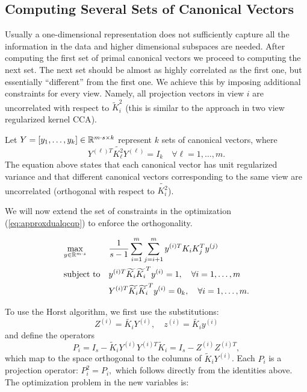 \subsection{Computing Several Sets of Canonical Vectors}\label{chap:extensions:severalCanonicalVectors}
Usually a one-dimensional representation does not sufficiently capture
all the information in the data and higher dimensional subspaces are
needed. After computing the first set of primal canonical vectors we
proceed to computing the next set. The next set should be almost as
highly correlated as the first one, but essentially ``different'' from
the first one. We achieve this by imposing additional constraints for
every view. Namely, all projection vectors in view $i$ are
uncorrelated with respect to $\widetilde{K}_i^2$ (this is similar to
the approach in two view regularized kernel CCA\cite{FBMJ}).
\par
Let $Y = \left[y_1, \ldots, y_k\right] \in \mathbb{R}^{m\cdot s  \times k}$
represent $k$ sets of canonical vectors, where
$$Y^{(\ell)T} \widetilde{K_{\ell}^2} Y^{(\ell)} = I_k  \quad\forall \ell = 1,\ldots, m. $$
The equation above states that each canonical vector has unit regularized variance
and that different canonical vectors corresponding to the same view are
uncorrelated (orthogonal with respect to $\widetilde{K_i^2}$).

We will now extend the set of constraints in the optimization (\ref{eq:approxdualqcqp})
to enforce the orthogonality.

 \begin{equation}\label{eq:kdimapproxdualqcqp}
\begin{aligned}
& \underset{y \in \mathbb{R}^{m\cdot s}}{\text{max}}
& & \frac{1}{s -1} \sum_{i = 1}^m \sum_{j = i+1}^m y^{(i)T} K_i K_j^T y^{(j)}\\
& \text{subject to}
& & y^{(i)T} \widetilde{K_i} \widetilde{K_i}^T y^{(i)} = 1, \quad\forall i = 1,\ldots, m\\
& & & Y^{(i)T} \widetilde{K_i} \widetilde{K_i}^T y^{(i)} = 0_k, \quad\forall i = 1,\ldots, m.
\end{aligned}
\end{equation}

To use the Horst algorithm, we first use the substitutions:
$$Z^{(i)} = \widetilde{K_i}Y^{(i)}, \quad z^{(i)} = \widetilde{K_i}y^{(i)}$$
and define the operators $$P_i = I_s - \widetilde{K}_i Y^{(i)} Y^{(i)T} \widetilde{K}_i = I_s - Z^{(i)} Z^{(i)T},$$
which map to the space orthogonal to the columns of $\widetilde{K}_i Y^{(i)}$.
Each $P_i$ is a projection operator: $P_i^2 = P_i,$ which follows directly from the identities above.
The optimization problem in the new variables is:

